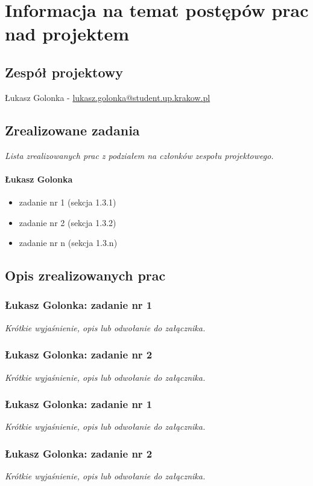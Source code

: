 \documentclass[12pt,a4paper,oneside]{article}
\theoremstyle{definition}
\numberwithin{equation}{section}
\begin{document}
\tableofcontents


\newpage

\section{Informacja na temat postępów prac nad projektem}
\subsection{Zespół projektowy}
Łukasz Golonka - \href{mailto:lukasz.golonka@student.up.krakow.pl}{lukasz.golonka@student.up.krakow.pl}
\subsection{Zrealizowane zadania}
\textit{Lista zrealizowanych prac z podziałem na członków zespołu projektowego.}
\paragraph{Łukasz Golonka}
\begin{itemize}
\item zadanie nr 1 (sekcja 1.3.1)
\item zadanie nr 2 (sekcja 1.3.2)
\item zadanie nr n (sekcja 1.3.n)
\end{itemize}

\subsection {Opis zrealizowanych prac}
\subsubsection{Łukasz Golonka: zadanie nr 1}
\textit{Krótkie wyjaśnienie, opis lub odwołanie do załącznika.}
\subsubsection{Łukasz Golonka: zadanie nr 2}
\textit{Krótkie wyjaśnienie, opis lub odwołanie do załącznika.}

\subsubsection{Łukasz Golonka: zadanie nr 1}
\textit{Krótkie wyjaśnienie, opis lub odwołanie do załącznika.}
\subsubsection{Łukasz Golonka: zadanie nr 2}
\textit{Krótkie wyjaśnienie, opis lub odwołanie do załącznika.}
\end{document}
